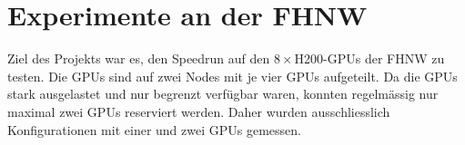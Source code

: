 \section{Experimente an der FHNW}

Ziel des Projekts war es, den Speedrun auf den 8\,×\,H200-GPUs der FHNW zu testen.
Die GPUs sind auf zwei Nodes mit je vier GPUs aufgeteilt.
Da die GPUs stark ausgelastet und nur begrenzt verfügbar waren, konnten regelmässig nur maximal zwei GPUs reserviert werden.
Daher wurden ausschliesslich Konfigurationen mit einer und zwei GPUs gemessen.

